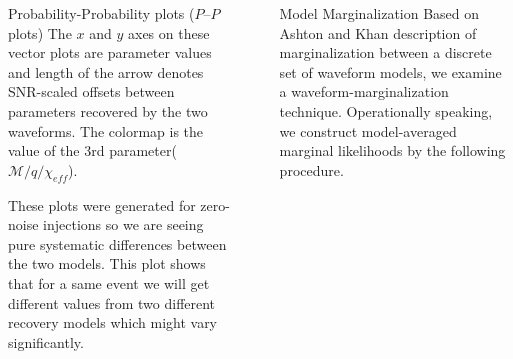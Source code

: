 \documentclass[serif]{beamer}
\begin{document}
\begin{frame}{}
\begin{columns}
\begin{column}[T]{0.35\textwidth}
\begin{block}{Probability-Probability plots ($P$--$P$ plots)}
 \small{The $x$ and $y$ axes on these vector plots are parameter values and length of the arrow denotes SNR-scaled offsets between parameters recovered by the two waveforms. The colormap is the value of the 3rd parameter($\mathcal{M}/q/\chi_{eff}$).}

\vspace{0.5em}

\normalsize{These plots were generated for zero-noise injections so we are seeing pure systematic differences between the two models. This plot shows that for a same event we will get different values from two different recovery models which might vary significantly.}





\end{block}




\vspace{1em}









\vfill
\end{column}
~
\begin{column}[T]{0.3\textwidth}


\begin{block}{Model Marginalization}
Based on Ashton and Khan \cite{Ashton:2019leq} description of marginalization between a discrete set of waveform models, we examine a waveform-marginalization technique. Operationally speaking, we construct model-averaged marginal likelihoods by the following procedure.


\end{block}
\end{column}
\end{columns}
\end{frame}
\end{document}
